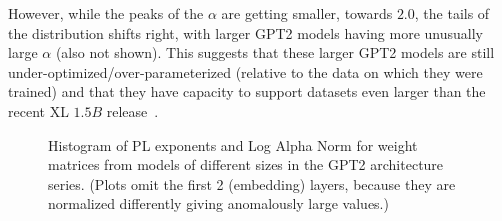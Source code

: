 However, while the peaks of the $\alpha$ are getting smaller, towards $2.0$, the tails of the distribution shifts right, with larger GPT2 models having more unusually large $\alpha$ (also not shown). 
This suggests that these larger GPT2 models are still under-optimized/over-parameterized (relative to the data on which they were trained) and that they have capacity to support datasets even larger than the recent XL $1.5B$ release~\cite{gpt2-xl}.

\begin{figure}[htb]
    \centering

    \quad
    \caption{Histogram of PL exponents 
             and Log Alpha Norm 
             for weight matrices from models of different sizes in the GPT2 architecture series.  (Plots omit the first 2 (embedding) layers, because they are normalized differently giving anomalously large values.)
             }
    \label{fig:gpt2-histograms}
\end{figure}
